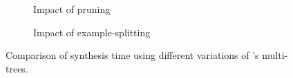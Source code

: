 \begin{figure}[t]
    \centering
    
    \begin{subfigure}[t]{0.47\textwidth}
         \centering
         \caption{Impact of pruning}
         \label{fig:mt_vs_nopruning}
     \end{subfigure}
     \hfill%
     \begin{subfigure}[t]{0.47
\textwidth}
         \centering
         \caption{Impact of example-splitting}
         \label{fig:mt_vs_dynamic}
     \end{subfigure}
\captionsetup{belowskip=-8pt}
\caption{Comparison of synthesis time using different variations of \Forest{}'s multi-trees.}
\label{fig:time-comparison-multitree}
\end{figure}
